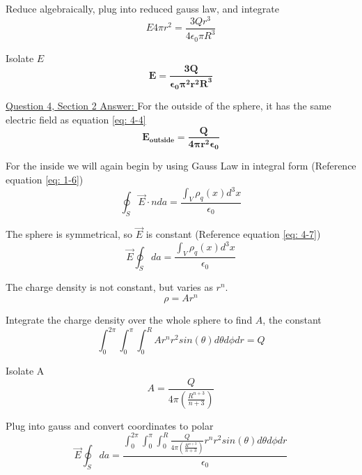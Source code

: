 \documentclass[English]{article}
\begin{document}
    Reduce algebraically, plug into reduced gauss law, and integrate
    \begin{equation} \label{eq: 4-12}
        E 4 \pi r^2 = \frac{3 Q r^3}{4 \epsilon_0 \pi R^3}
    \end{equation}

    Isolate $E$
    \begin{equation} \label{eq: 4-13}
        \boxed{\boldsymbol{E = \frac{3 Q}{\epsilon_0 \pi^2 r^2 R^3}}}
    \end{equation}

    \underline{Question 4, Section 2 Answer: }
    \newline \newline For the outside of the sphere, it has the same electric field as equation \ref{eq: 4-4}
    \begin{equation}
        \boxed{\boldsymbol{E_{outside} = \frac{Q}{4 \pi r^2 \epsilon_0}}}
    \end{equation}

    For the inside we will again begin by using Gauss Law in integral form (Reference equation \ref{eq: 1-6})
    \begin{equation}
        \oint_S \vec{E} \cdot n da = \frac{\int_V \rho_q(x) d^3 x}{\epsilon_0}        
    \end{equation}

    The sphere is symmetrical, so $\vec{E}$ is constant (Reference equation \ref{eq: 4-7})
    \begin{equation}
        \vec{E} \oint_S da = \frac{\int_V \rho_q(x) d^3 x}{\epsilon_0}         
    \end{equation}

    The charge density is not constant, but varies as $r^n$.
    \begin{equation} \label{eq: 4-14}
        \rho = A r^n
    \end{equation}

    Integrate the charge density over the whole sphere to find $A$, the constant
    \begin{equation} \label{eq: 4-15}
        \int_0^{2 \pi} \int_0^{\pi} \int_0^R A r^n r^2 sin(\theta) d\theta d\phi dr = Q
    \end{equation}

    Isolate A
    \begin{equation} \label{eq: 4-16}
        A = \frac{Q}{4 \pi (\frac{R^{n+3}}{n+3})}
    \end{equation}

    Plug into gauss and convert coordinates to polar
    \begin{equation} \label{eq: 4-17}
        \vec{E} \oint_S da = \frac{\int_0^{2 \pi} \int_0^{\pi} \int_0^R \frac{Q}{4 \pi (\frac{R^{n+3}}{n+3})} r^n r^2 sin(\theta) d\theta d\phi dr}{\epsilon_0}         
    \end{equation}
\end{document}
